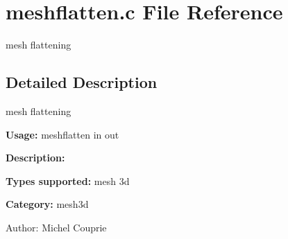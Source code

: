 \section{meshflatten.c File Reference}
\label{meshflatten_8c}
mesh flattening  




\label{_details}
\subsection{Detailed Description}
mesh flattening 

{\bf Usage:} meshflatten in out

{\bf Description:}

{\bf Types supported:} mesh 3d

{\bf Category:} mesh3d

\begin{Desc}
\item[Author:]Michel Couprie \end{Desc}
